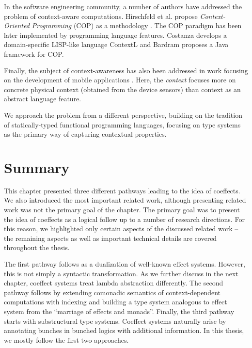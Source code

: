 In the software engineering community, a number of authors have addressed the
problem of context-aware computations. Hirschfeld et al. propose \emph{Context-Oriented Programming} 
(COP) as a methodology \cite{app-cop-method}. The COP paradigm has been later implemented by
programming language features. Costanza \cite{app-cop-contextl} develops a domain-specific LISP-like 
language ContextL and Bardram \cite{app-cop-javafwk} proposes a Java framework for COP.

Finally, the subject of context-awareness has also been addressed in work focusing on the development 
of mobile applications \cite{app-cop-mobile,app-cop-mobile2}. Here, the \emph{context} focuses more 
on concrete physical context (obtained from the device sensors) than context as an abstract 
language feature.

We approach the problem from a different perspective, building on the tradition of 
statically-typed functional programming languages, focusing on type systems as the primary way
of capturing contextual properties. 


\section{Summary}

This chapter presented three different pathways leading to the idea of coeffects. We also 
introduced the most important related work, although presenting related work was not the
primary goal of the chapter. The primary goal was to present the idea of coeffects as a logical 
follow up to a number of research directions. For this reason, we highlighted only certain aspects 
of the discussed related work -- the remaining aspects as well as important technical details are
covered throughout the thesis.

The first pathway follows as a dualization of well-known effect systems. However, this is not simply 
a syntactic transformation. As we further discuss in the next chapter, coeffect systems treat lambda 
abstraction differently. The second pathway follows by extending comonadic semantics of context-dependent 
computations with indexing and building a type system analogous to effect system from the ``marriage of 
effects and monads''. Finally, the third pathway starts with substructural type systems. Coeffect
systems naturally arise by annotating bunches in bunched logics with additional information. In this
thesis, we mostly follow the first two approaches.